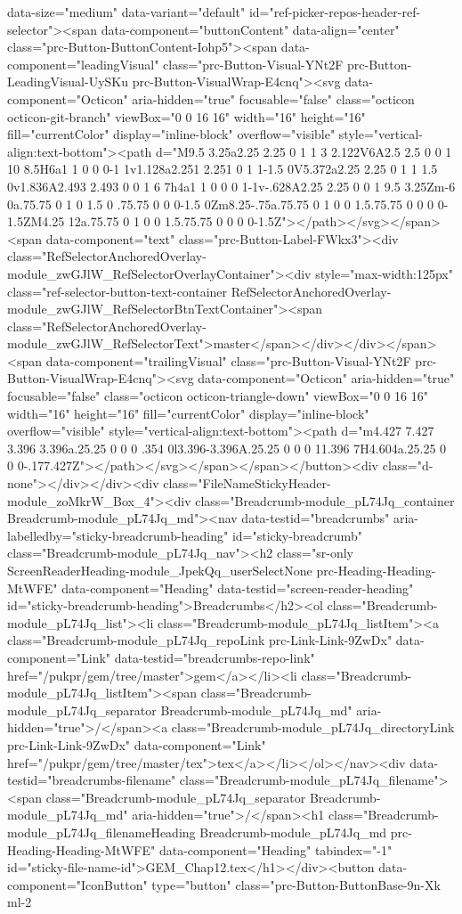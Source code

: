 data-size="medium" data-variant="default" id="ref-picker-repos-header-ref-selector"><span data-component="buttonContent" data-align="center" class="prc-Button-ButtonContent-Iohp5"><span data-component="leadingVisual" class="prc-Button-Visual-YNt2F prc-Button-LeadingVisual-UySKu prc-Button-VisualWrap-E4cnq"><svg data-component="Octicon" aria-hidden="true" focusable="false" class="octicon octicon-git-branch" viewBox="0 0 16 16" width="16" height="16" fill="currentColor" display="inline-block" overflow="visible" style="vertical-align:text-bottom"><path d="M9.5 3.25a2.25 2.25 0 1 1 3 2.122V6A2.5 2.5 0 0 1 10 8.5H6a1 1 0 0 0-1 1v1.128a2.251 2.251 0 1 1-1.5 0V5.372a2.25 2.25 0 1 1 1.5 0v1.836A2.493 2.493 0 0 1 6 7h4a1 1 0 0 0 1-1v-.628A2.25 2.25 0 0 1 9.5 3.25Zm-6 0a.75.75 0 1 0 1.5 0 .75.75 0 0 0-1.5 0Zm8.25-.75a.75.75 0 1 0 0 1.5.75.75 0 0 0 0-1.5ZM4.25 12a.75.75 0 1 0 0 1.5.75.75 0 0 0 0-1.5Z"></path></svg></span><span data-component="text" class="prc-Button-Label-FWkx3"><div class="RefSelectorAnchoredOverlay-module_zwGJlW_RefSelectorOverlayContainer"><div style="max-width:125px" class="ref-selector-button-text-container RefSelectorAnchoredOverlay-module_zwGJlW_RefSelectorBtnTextContainer"><span class="RefSelectorAnchoredOverlay-module_zwGJlW_RefSelectorText">master</span></div></div></span><span data-component="trailingVisual" class="prc-Button-Visual-YNt2F prc-Button-VisualWrap-E4cnq"><svg data-component="Octicon" aria-hidden="true" focusable="false" class="octicon octicon-triangle-down" viewBox="0 0 16 16" width="16" height="16" fill="currentColor" display="inline-block" overflow="visible" style="vertical-align:text-bottom"><path d="m4.427 7.427 3.396 3.396a.25.25 0 0 0 .354 0l3.396-3.396A.25.25 0 0 0 11.396 7H4.604a.25.25 0 0 0-.177.427Z"></path></svg></span></span></button><div class="d-none"></div></div><div class="FileNameStickyHeader-module_zoMkrW_Box_4"><div class="Breadcrumb-module_pL74Jq_container Breadcrumb-module_pL74Jq_md"><nav data-testid="breadcrumbs" aria-labelledby="sticky-breadcrumb-heading" id="sticky-breadcrumb" class="Breadcrumb-module_pL74Jq_nav"><h2 class="sr-only ScreenReaderHeading-module_JpekQq_userSelectNone prc-Heading-Heading-MtWFE" data-component="Heading" data-testid="screen-reader-heading" id="sticky-breadcrumb-heading">Breadcrumbs</h2><ol class="Breadcrumb-module_pL74Jq_list"><li class="Breadcrumb-module_pL74Jq_listItem"><a class="Breadcrumb-module_pL74Jq_repoLink prc-Link-Link-9ZwDx" data-component="Link" data-testid="breadcrumbs-repo-link" href="/pukpr/gem/tree/master">gem</a></li><li class="Breadcrumb-module_pL74Jq_listItem"><span class="Breadcrumb-module_pL74Jq_separator Breadcrumb-module_pL74Jq_md" aria-hidden="true">/</span><a class="Breadcrumb-module_pL74Jq_directoryLink prc-Link-Link-9ZwDx" data-component="Link" href="/pukpr/gem/tree/master/tex">tex</a></li></ol></nav><div data-testid="breadcrumbs-filename" class="Breadcrumb-module_pL74Jq_filename"><span class="Breadcrumb-module_pL74Jq_separator Breadcrumb-module_pL74Jq_md" aria-hidden="true">/</span><h1 class="Breadcrumb-module_pL74Jq_filenameHeading Breadcrumb-module_pL74Jq_md prc-Heading-Heading-MtWFE" data-component="Heading" tabindex="-1" id="sticky-file-name-id">GEM_Chap12.tex</h1></div><button data-component="IconButton" type="button" class="prc-Button-ButtonBase-9n-Xk ml-2 
